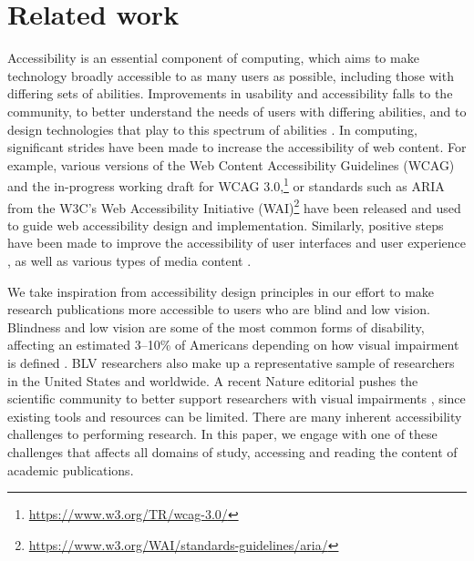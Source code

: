 \section{Related work}
\label{sec:related_work}

Accessibility is an essential component of computing, which aims to make technology broadly accessible to as many users as possible, including those with differing sets of abilities. Improvements in usability and accessibility falls to the community, to better understand the needs of users with differing abilities, and to design technologies that play to this spectrum of abilities \citep{Wobbrock2011AbilityBasedDC}.
In computing, significant strides have been made to increase the accessibility of web content. For example, various versions of the Web Content Accessibility Guidelines (WCAG) \citep{Chisholm2001WebCA, Caldwell2008WebCA} and the in-progress working draft for WCAG 3.0,\footnote{\href{https://www.w3.org/TR/wcag-3.0/}{https://www.w3.org/TR/wcag-3.0/}} or standards such as ARIA from the W3C's Web Accessibility Initiative (WAI)\footnote{\href{https://www.w3.org/WAI/standards-guidelines/aria/}{https://www.w3.org/WAI/standards-guidelines/aria/}} have been released and used to guide web accessibility design and implementation. Similarly, positive steps have been made to improve the accessibility of user interfaces and user experience \citep{Peissner2012MyUIGA, Peissner2013UserCI, Thompson2014ImprovingTU, Bigham2014MakingTW}, as well as various types of media content \citep{Mirri2017TowardsAG, Nengroo2017AccessibleI, Gleason2020TwitterAA}. 

We take inspiration from accessibility design principles in our effort to make research publications more accessible to users who are blind and low vision. Blindness and low vision are some of the most common forms of disability, affecting an estimated 3--10\% of Americans depending on how visual impairment is defined \citep{CDCVisionLossBurden}. BLV researchers also make up a representative sample of researchers in the United States and worldwide. A recent Nature editorial pushes the scientific community to better support researchers with visual impairments \citep{NatureCareerColumn2020}, since existing tools and resources can be limited. There are many inherent accessibility challenges to performing research. In this paper, we engage with one of these challenges that affects all domains of study, accessing and reading the content of academic publications. 

